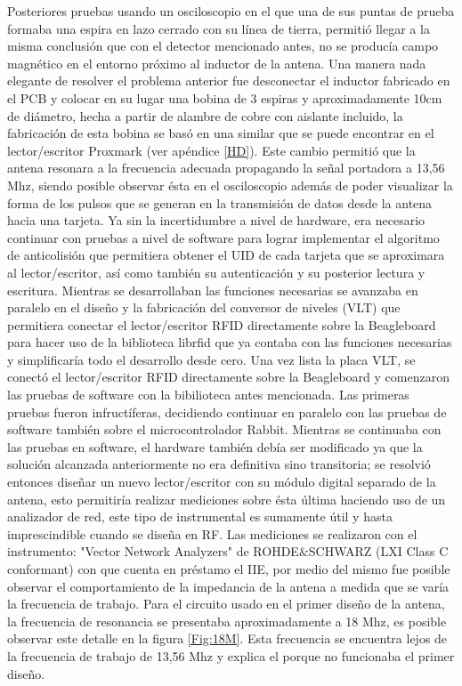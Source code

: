 Posteriores pruebas usando un osciloscopio en el que una de sus puntas de prueba formaba una espira en lazo cerrado con su línea de tierra, permitió llegar a la misma conclusión que con el detector mencionado antes, no se producía campo magnético en el entorno próximo al inductor de la antena.  
Una manera nada elegante de resolver el problema anterior fue desconectar el inductor fabricado en el PCB y colocar en su lugar una bobina de 3 espiras y aproximadamente 10cm de diámetro, hecha a partir de alambre de cobre con aislante incluido,  la fabricación de esta bobina se basó en una similar que se puede encontrar en el lector/escritor Proxmark \cite{Proxmark} (ver apéndice \ref{HD}). Este cambio permitió que la antena resonara a la frecuencia adecuada propagando la señal portadora a 13,56 Mhz, siendo posible observar ésta en el osciloscopio además de poder visualizar la forma de los pulsos que se generan en la transmisión de datos desde la antena hacia una tarjeta.
Ya sin la incertidumbre a nivel de hardware, era necesario continuar con pruebas a nivel de software para lograr implementar el algoritmo de anticolisión que permitiera obtener el UID de cada tarjeta que se aproximara al lector/escritor, así como también su autenticación y su posterior lectura y escritura. Mientras se desarrollaban las funciones necesarias se avanzaba en paralelo en el diseño y la fabricación del conversor de niveles (VLT) que permitiera conectar el lector/escritor RFID directamente sobre la Beagleboard para hacer uso de la biblioteca librfid que ya contaba con las funciones necesarias y simplificaría todo el desarrollo desde cero.
Una vez lista la placa VLT, se conectó el lector/escritor RFID directamente sobre la Beagleboard y comenzaron las pruebas de software con la bibilioteca antes mencionada. Las primeras pruebas fueron infructíferas, decidiendo continuar en paralelo con las pruebas de software también sobre el microcontrolador Rabbit. 
Mientras se continuaba con las pruebas en software, el hardware también debía ser modificado ya que la solución alcanzada anteriormente no era definitiva sino transitoria; se resolvió entonces diseñar un nuevo lector/escritor con su módulo digital separado de la antena, esto permitiría realizar mediciones sobre ésta última haciendo uso de un analizador de red, este tipo de instrumental es sumamente útil y hasta imprescindible cuando se diseña en RF.
Las mediciones se realizaron con el instrumento: "Vector Network Analyzers" de 
ROHDE$\&$SCHWARZ (LXI Class C conformant) con que cuenta en préstamo el IIE, por medio del mismo fue posible observar el comportamiento de la impedancia de la antena a medida que se varía la frecuencia de trabajo.
Para el circuito usado en el primer diseño de la antena, la frecuencia de resonancia se presentaba aproximadamente a 18 Mhz, es posible observar este detalle en la figura \ref{Fig:18M}. Esta frecuencia se encuentra lejos de la frecuencia de trabajo de 13,56 Mhz y explica el porque no funcionaba el primer diseño.

